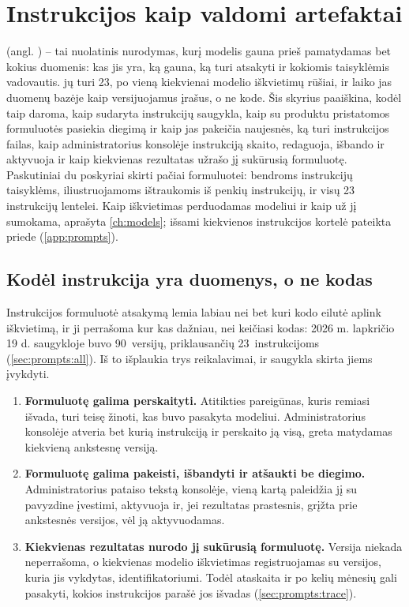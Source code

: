 \chapter{Instrukcijos kaip valdomi artefaktai}\label{ch:prompts}

 (angl. ) -- tai nuolatinis nurodymas, kurį modelis gauna prieš
pamatydamas bet kokius duomenis: kas jis yra, ką gauna, ką turi atsakyti ir kokiomis
taisyklėmis vadovautis. \product{} jų turi 23, po vieną kiekvienai modelio iškvietimų rūšiai,
ir laiko jas duomenų bazėje kaip versijuojamus įrašus, o ne kode. Šis skyrius paaiškina, kodėl
taip daroma, kaip sudaryta instrukcijų saugykla, kaip su produktu pristatomos formuluotės
pasiekia diegimą ir kaip jas pakeičia naujesnės, ką turi instrukcijos failas, kaip
administratorius konsolėje instrukciją skaito, redaguoja, išbando ir aktyvuoja ir kaip kiekvienas
rezultatas užrašo jį sukūrusią formuluotę. Paskutiniai du poskyriai skirti pačiai formuluotei:
bendroms instrukcijų taisyklėms, iliustruojamoms ištraukomis iš penkių instrukcijų, ir visų 23
instrukcijų lentelei. Kaip iškvietimas perduodamas modeliui ir kaip už jį sumokama, aprašyta
\cref{ch:models}; išsami kiekvienos instrukcijos kortelė pateikta priede
(\cref{app:prompts}).


\section{Kodėl instrukcija yra duomenys, o ne kodas}\label{sec:prompts:why}

Instrukcijos formuluotė atsakymą lemia labiau nei bet kuri kodo eilutė aplink iškvietimą, ir ji
perrašoma kur kas dažniau, nei keičiasi kodas: 2026 m. lapkričio 19 d. saugykloje
buvo 90~versijų, priklausančių 23~instrukcijoms (\cref{sec:prompts:all}). Iš to išplaukia trys
reikalavimai, ir saugykla skirta jiems įvykdyti.

\begin{enumerate}
  \item \textbf{Formuluotę galima perskaityti.} Atitikties pareigūnas, kuris remiasi išvada,
    turi teisę žinoti, kas buvo pasakyta modeliui. Administratorius konsolėje atveria bet kurią
    instrukciją ir perskaito ją visą, greta matydamas kiekvieną ankstesnę versiją.
  \item \textbf{Formuluotę galima pakeisti, išbandyti ir atšaukti be diegimo.} Administratorius
    pataiso tekstą konsolėje, vieną kartą paleidžia jį su pavyzdine įvestimi, aktyvuoja ir, jei
    rezultatas prastesnis, grįžta prie ankstesnės versijos, vėl ją aktyvuodamas.
  \item \textbf{Kiekvienas rezultatas nurodo jį sukūrusią formuluotę.} Versija niekada
    neperrašoma, o kiekvienas modelio iškvietimas registruojamas su versijos, kuria jis
    vykdytas, identifikatoriumi. Todėl ataskaita ir po kelių mėnesių gali pasakyti, kokios
    instrukcijos parašė jos išvadas (\cref{sec:prompts:trace}).
\end{enumerate}

